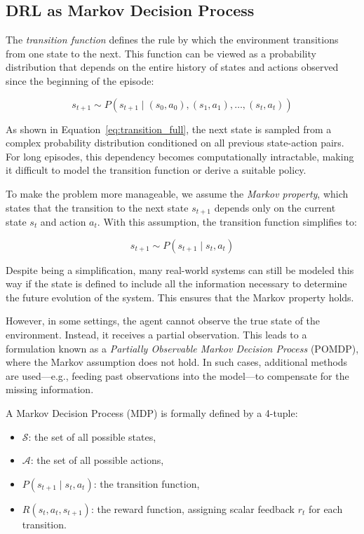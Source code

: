 \documentclass[a4paper,oneside]{book}
\theoremstyle{definition}
\begin{document}
\subsection{DRL as Markov Decision Process}
The \textit{transition function} defines the rule by which the environment transitions from one state to the next. This function can be viewed as a probability distribution that depends on the entire history of states and actions observed since the beginning of the episode:

\begin{equation}
s_{t+1} \sim P(s_{t+1} \mid (s_0, a_0), (s_1, a_1), \dots, (s_t, a_t))
\label{eq:transition_full}
\end{equation}

As shown in Equation~\eqref{eq:transition_full}, the next state is sampled from a complex probability distribution conditioned on all previous state-action pairs. For long episodes, this dependency becomes computationally intractable, making it difficult to model the transition function or derive a suitable policy.

To make the problem more manageable, we assume the \textit{Markov property}, which states that the transition to the next state \( s_{t+1} \) depends only on the current state \( s_t \) and action \( a_t \). With this assumption, the transition function simplifies to:

\begin{equation}
s_{t+1} \sim P(s_{t+1} \mid s_t, a_t)
\label{eq:markov_transition}
\end{equation}

Despite being a simplification, many real-world systems can still be modeled this way if the state is defined to include all the information necessary to determine the future evolution of the system. This ensures that the Markov property holds.

However, in some settings, the agent cannot observe the true state of the environment. Instead, it receives a partial observation. This leads to a formulation known as a \textit{Partially Observable Markov Decision Process} (POMDP), where the Markov assumption does not hold. In such cases, additional methods are used—e.g., feeding past observations into the model—to compensate for the missing information.

A Markov Decision Process (MDP) is formally defined by a 4-tuple:

\begin{itemize}
    \item \( \mathcal{S} \): the set of all possible states,
    \item \( \mathcal{A} \): the set of all possible actions,
    \item \( P(s_{t+1} \mid s_t, a_t) \): the transition function,
    \item \( R(s_t, a_t, s_{t+1}) \): the reward function, assigning scalar feedback \( r_t \) for each transition.
\end{itemize}
\end{document}
